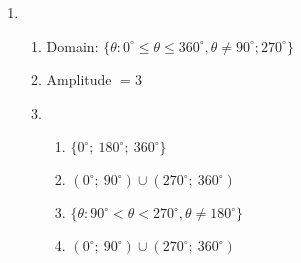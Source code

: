\begin{eocsolutions}{}
{\begin{enumerate}[itemsep=8pt, label=\textbf{\arabic*}. ]
\item %
    \begin{enumerate}[noitemsep, label=\textbf{(\alph*)} ]
    \item Domain: $\{\theta: 0^{\circ}\leq\theta\leq 360^{\circ}, \theta \ne 90^{\circ}; 270^{\circ}\}$%
    \item Amplitude $=3$%
    \item %
      \begin{enumerate}[noitemsep, label=\textbf{\roman*}. ]
	    \item $\{0^{\circ};~180^{\circ};~360^{\circ}\}$%
	    \item $(0^{\circ};~90^{\circ}) \cup (270^{\circ};~360^{\circ})$%
	    \item $\{\theta: 90^{\circ}<\theta<270^{\circ}, \theta \ne 180^{\circ}\}$%
	    \item $(0^{\circ};~90^{\circ}) \cup (270^{\circ};~360^{\circ})$%
  \end{enumerate}

  \end{enumerate}

\end{enumerate}}
\end{eocsolutions}



